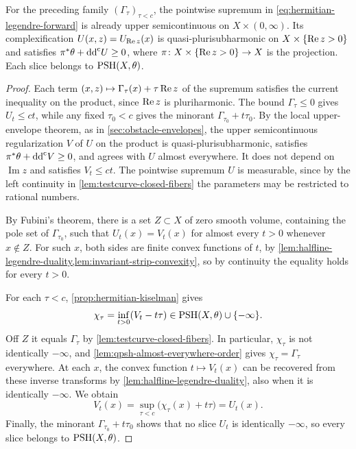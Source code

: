 \begin{theorem}\label{thm:hermitian-legendre-usc}
For the preceding family $(\Gamma_\tau)_{\tau<c}$, the pointwise supremum in \eqref{eq:hermitian-legendre-forward} is already upper semicontinuous on $X\times(0,\infty)$. Its complexification $U(x,z)=U_{\operatorname{Re} z}(x)$ is quasi-plurisubharmonic on $X\times\{\operatorname{Re} z>0\}$ and satisfies $\pi^*\theta+\mathrm{dd}^{\mathrm{c}} U\geq0$, where $\pi\colon X\times\{\operatorname{Re} z>0\}\to X$ is the projection. Each slice belongs to $\mathrm{PSH}(X,\theta)$.
\end{theorem}
\begin{proof}
Each term $(x,z)\mapsto\Gamma_\tau(x)+\tau\operatorname{Re} z$ of the supremum satisfies the current inequality on the product, since $\operatorname{Re} z$ is pluriharmonic. The bound $\Gamma_\tau\leq0$ gives $U_t\leq ct$, while any fixed $\tau_0<c$ gives the minorant $\Gamma_{\tau_0}+t\tau_0$. By the local upper-envelope theorem, as in \cref{sec:obstacle-envelopes}, the upper semicontinuous regularization $V$ of $U$ on the product is quasi-plurisubharmonic, satisfies $\pi^*\theta+\mathrm{dd}^{\mathrm{c}} V\geq0$, and agrees with $U$ almost everywhere. It does not depend on $\operatorname{Im}z$ and satisfies $V_t\leq ct$. The pointwise supremum $U$ is measurable, since by the left continuity in \cref{lem:testcurve-closed-fibers} the parameters may be restricted to rational numbers.

By Fubini's theorem, there is a set $Z\subset X$ of zero smooth volume, containing the pole set of $\Gamma_{\tau_0}$, such that $U_t(x)=V_t(x)$ for almost every $t>0$ whenever $x\notin Z$. For such $x$, both sides are finite convex functions of $t$, by \cref{lem:halfline-legendre-duality,lem:invariant-strip-convexity}, so by continuity the equality holds for every $t>0$.

For each $\tau<c$, \cref{prop:hermitian-kiselman} gives
\[
 \chi_\tau=\inf_{t>0}(V_t-t\tau)
 \in\mathrm{PSH}(X,\theta)\cup\{-\infty\}.
\]
Off $Z$ it equals $\Gamma_\tau$ by \cref{lem:testcurve-closed-fibers}. In particular, $\chi_\tau$ is not identically $-\infty$, and \cref{lem:qpsh-almost-everywhere-order} gives $\chi_\tau=\Gamma_\tau$ everywhere. At each $x$, the convex function $t\mapsto V_t(x)$ can be recovered from these inverse transforms by \cref{lem:halfline-legendre-duality}, also when it is identically $-\infty$. We obtain
\[
 V_t(x)=\sup_{\tau<c}\bigl(\chi_\tau(x)+t\tau\bigr)=U_t(x).
\]
Finally, the minorant $\Gamma_{\tau_0}+t\tau_0$ shows that no slice $U_t$ is identically $-\infty$, so every slice belongs to $\mathrm{PSH}(X,\theta)$.
\end{proof}
